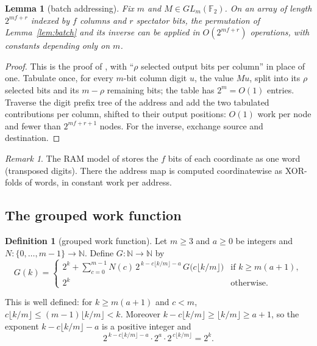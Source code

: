 \documentclass[11pt]{article}
\newtheorem{lemma}[theorem]{Lemma}
\theoremstyle{definition}
\newtheorem{definition}[theorem]{Definition}
\theoremstyle{remark}
\newtheorem{remark}[theorem]{Remark}
\newcommand{\F}{\mathbb{F}_2}
\newcommand{\N}{\mathbb{N}}
\begin{document}
\begin{lemma}[batch addressing]\label{lem:address}
Fix $m$ and $M\in GL_m(\F)$. On an array of length $2^{mf+r}$ indexed by $f$ columns and $r$ spectator
bits, the permutation of Lemma~\ref{lem:batch} and its inverse can be applied in $O(2^{mf+r})$
operations, with constants depending only on $m$.
\end{lemma}
\begin{proof}
This is the proof of \cite[Lemma~2.5]{oai}, with ``$\rho$ selected output bits per column'' in place of
one. Tabulate once, for every $m$-bit column digit $u$, the value $Mu$, split into its $\rho$ selected
bits and its $m-\rho$ remaining bits; the table has $2^m=O(1)$ entries. Traverse the digit prefix tree
of the address and add the two tabulated contributions per column, shifted to their output positions:
$O(1)$ work per node and fewer than $2^{mf+r+1}$ nodes. For the inverse, exchange source and
destination.
\end{proof}

\begin{remark}
The RAM model of \cite{oailean} stores the $f$ bits of each coordinate as one word (transposed
digits). There the address map is computed coordinatewise as XOR-folds of words, in constant work per
address.
\end{remark}

\subsection{The grouped work function}
\begin{definition}[grouped work function]\label{def:gallot}
Let $m\ge3$ and $a\ge0$ be integers and $N:\{0,\dots,m-1\}\to\N$. Define $G:\N\to\N$ by
\[
  G(k)=
  \begin{cases}
  2^k+\displaystyle\sum_{c=0}^{m-1}N(c)\,2^{\,k-c\lfloor k/m\rfloor-a}\,G\big(c\lfloor k/m\rfloor\big)
    & \text{if }k\ge m(a+1),\\[1ex]
  2^k&\text{otherwise.}
  \end{cases}
\]
\end{definition}

This is well defined: for $k\ge m(a+1)$ and $c<m$, $c\lfloor k/m\rfloor\le(m-1)\lfloor k/m\rfloor<k$.
Moreover $k-c\lfloor k/m\rfloor\ge\lfloor k/m\rfloor\ge a+1$, so the exponent $k-c\lfloor k/m\rfloor-a$ is
a positive integer and
\begin{equation}\label{eq:rounds}
  2^{\,k-c\lfloor k/m\rfloor-a}\cdot2^a\cdot2^{\,c\lfloor k/m\rfloor}=2^k .
\end{equation}
\end{document}
